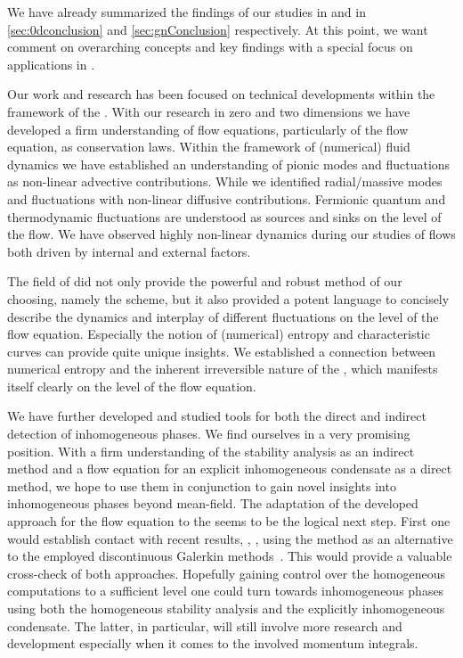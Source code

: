 We have already summarized the findings of our studies in \dzero{} and \dtwo{} in \cref{sec:0dconclusion} and \cref{sec:gnConclusion} respectively. 
At this point, we want comment on overarching concepts and key findings with a special focus on applications in \dfour{}.\bigskip

Our work and research has been focused on technical developments within the framework of the \frg{}.
With our research in zero and two dimensions we have developed a firm understanding of \frg{} flow equations, particularly of the \lpa{} flow equation, as conservation laws.
Within the framework of (numerical) fluid dynamics we have established an understanding of pionic modes and fluctuations as non-linear advective contributions.
While we identified radial/massive modes and fluctuations with non-linear diffusive contributions.
Fermionic quantum and thermodynamic fluctuations are understood as sources and sinks on the level of the \lpa{} flow.
We have observed highly non-linear dynamics during our studies of \frg{} flows both driven by internal and external factors.

The field of \cfd{} did not only provide the powerful and robust \fv{} method of our choosing, namely the \kt{} scheme, but it also provided a potent language to concisely describe the dynamics and interplay of different fluctuations on the level of the flow equation.
Especially the notion of (numerical) entropy and characteristic curves can provide quite unique insights.
We established a connection between numerical entropy and the inherent irreversible nature of the \frg{}, which manifests itself clearly on the level of the flow equation.

We have further developed and studied tools for  both the direct and indirect detection of inhomogeneous phases. We find ourselves in a very promising position. With a firm understanding of the stability analysis as an indirect method and a \lpa{} flow equation for an explicit inhomogeneous condensate as a direct method, we hope to use them in conjunction to gain novel insights into inhomogeneous phases beyond mean-field.
The adaptation of the developed \cfd{} approach for the \lpa{} flow equation to the \qmm{} seems to be the logical next step.
First one would establish contact with recent results, \eg{}, , using the \fv{} method as an alternative to the employed discontinuous Galerkin methods~\cite{Grossi:2019urj,Grossi:2021ksl,Ihssen:2023xlp}. 
This would provide a valuable cross-check of both approaches. 
Hopefully gaining control over the homogeneous computations to a sufficient level one could turn towards inhomogeneous phases  using both the homogeneous stability analysis and the explicitly inhomogeneous \cdw{} condensate.
The latter, in particular, will still involve more research and development especially when it comes to the involved momentum integrals.\bigskip

